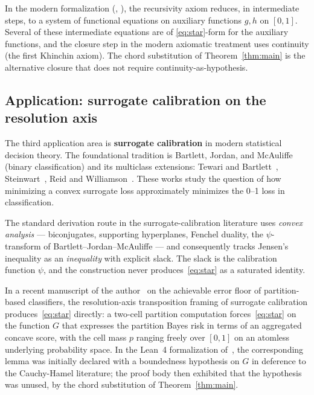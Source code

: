 \documentclass[review,12pt,a4paper]{elsarticle}
\theoremstyle{remark}
\begin{document}
In the modern formalization (\cite[Ch.~5]{Aczel1966},
\cite[\S22]{AczelDhombres1989}), the recursivity axiom reduces, in
intermediate steps, to a system of functional equations on auxiliary
functions $g,h$ on $[0,1]$. Several of these intermediate equations are
of \eqref{eq:star}-form for the auxiliary functions, and the closure step
in the modern axiomatic treatment uses continuity (the first Khinchin
axiom). The chord substitution of Theorem~\ref{thm:main} is the
alternative closure that does not require continuity-as-hypothesis.

\subsection{Application: surrogate calibration on the resolution axis}
\label{ssec:calibration}

The third application area is \textbf{surrogate calibration} in modern
statistical decision theory. The foundational tradition is Bartlett,
Jordan, and McAuliffe~\cite{BJM2006} (binary classification) and its
multiclass extensions: Tewari and Bartlett~\cite{TewariBartlett2007},
Steinwart~\cite{Steinwart2007}, Reid and
Williamson~\cite{ReidWilliamson2010,ReidWilliamson2011}. These works study
the question of how minimizing a convex surrogate loss approximately
minimizes the 0--1 loss in classification.

The standard derivation route in the surrogate-calibration literature uses
\emph{convex analysis} --- biconjugates, supporting hyperplanes, Fenchel
duality, the $\psi$-transform of Bartlett--Jordan--McAuliffe --- and
consequently tracks Jensen's inequality as an \emph{inequality} with
explicit slack. The slack is the calibration function $\psi$, and the
construction never produces~\eqref{eq:star} as a saturated identity.

In a recent manuscript of the author~\cite{El2} on the achievable error
floor of partition-based classifiers, the resolution-axis transposition
framing of surrogate calibration produces~\eqref{eq:star} directly: a
two-cell partition computation forces~\eqref{eq:star} on the function $G$
that expresses the partition Bayes risk in terms of an aggregated concave
score, with the cell mass $p$ ranging freely over $[0,1]$ on an atomless
underlying probability space. In the Lean~4 formalization of~\cite{El2},
the corresponding lemma was initially declared with a boundedness
hypothesis on $G$ in deference to the Cauchy-Hamel literature; the proof
body then exhibited that the hypothesis was unused, by the chord
substitution of Theorem~\ref{thm:main}.
\end{document}
